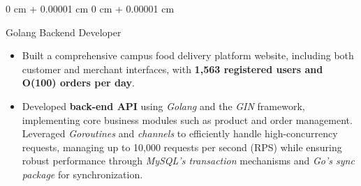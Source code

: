 \documentclass[10pt, letterpaper]{article}
\newenvironment{highlights}{
    \begin{itemize}[
        topsep=0.10 cm,
        parsep=0.10 cm,
        partopsep=0pt,
        itemsep=0pt,
        leftmargin=0 cm + 10pt
    ]
}{
    \end{itemize}
} %
\newenvironment{onecolentry}{
    \begin{adjustwidth}{
        0 cm + 0.00001 cm
    }{
        0 cm + 0.00001 cm
    }
}{
    \end{adjustwidth}
} %
\newenvironment{twocolentry}[2][]{
    \onecolentry
    \def\secondColumn{#2}
    \setcolumnwidth{\fill, 4.5 cm}
    \begin{paracol}{2}
}{
    \switchcolumn \raggedleft \secondColumn
    \end{paracol}
    \endonecolentry
} %
\begin{document}
        \begin{onecolentry}
        Golang Backend Developer
            \begin{highlights}
                \item Built a comprehensive campus food delivery platform website, including both customer and merchant interfaces, with \textbf{1,563 registered users and O(100) orders per day}. 
                \item Developed \textbf{back-end API} using \textit{Golang} and the \textit{GIN} framework, implementing core business modules such as product and order management. Leveraged \textit{Goroutines} and \textit{channels} to efficiently handle high-concurrency requests, managing up to 10,000 requests per second (RPS) while ensuring robust performance through \textit{MySQL’s transaction} mechanisms and \textit{Go’s sync package} for synchronization.
                
            \end{highlights}
        \end{onecolentry}


       


    

   



    



        

            

                
\end{document}
